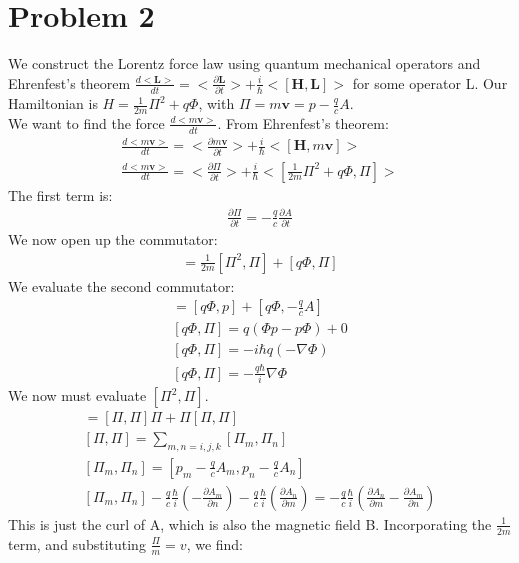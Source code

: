 \documentclass[a4paper,11pt]{article}
\numberwithin{equation}{section}
\newcommand{\bv}[1]{\mathbf{#1}}
\begin{document}
\section{Problem 2}
We construct the Lorentz force law using quantum mechanical operators and Ehrenfest's theorem 
$\frac{d<\bv{L}>}{dt}=<\frac{\partial \bv{L}}{\partial t} >+\frac{i}{\hbar}<[\bv{H}, \bv{L} ]>$ for some operator L.
Our Hamiltonian is $H=\frac{1}{2m}\Pi^2+q\Phi$, with $\Pi = m\bv{v}=p-\frac{q}{c}A$.
\\
We want to find the force $\frac{d<m\bv{v}>}{dt}$. From Ehrenfest's theorem:
\begin{gather}
 \frac{d<m\bv{v}>}{dt}=<\frac{\partial m\bv{v}}{\partial t} >+\frac{i}{\hbar}<[\bv{H}, m\bv{v} ]>\\
 \frac{d<m\bv{v}>}{dt}=<\frac{\partial \Pi}{\partial t} >+\frac{i}{\hbar}<[\frac{1}{2m}\Pi^2+q\Phi, \Pi ]>
\end{gather}
The first term is:
\begin{gather}
 \frac{\partial \Pi}{\partial t}=-\frac{q}{c}\frac{\partial A}{\partial t}
\end{gather}
We now open up the commutator:
\begin{gather}
 [\frac{1}{2m}\Pi^2+q\Phi, \Pi ]= \frac{1}{2m}[\Pi^2, \Pi] + [q\Phi, \Pi]
\end{gather}
We evaluate the second commutator:
\begin{gather}
 [q\Phi, \Pi]=[q\Phi,p]+[q\Phi,-\frac{q}{c}A]\\
 [q\Phi, \Pi]=q(\Phi p-p\Phi)+0\\
 [q\Phi, \Pi]=-i\hbar q(-\nabla \Phi)\\
 [q\Phi, \Pi]=-\frac{q \hbar}{i}\nabla\Phi
\end{gather}
We now must evaluate $[\Pi^2, \Pi]$.
\begin{gather}
 [\Pi^2,\Pi] = [\Pi, \Pi]\Pi+\Pi[\Pi, \Pi]\\
 [\Pi, \Pi] = \sum_{m,n = i,j,k} [\Pi_m, \Pi_n]\\
 [\Pi_m, \Pi_n] = [p_m-\frac{q}{c}A_m,p_n-\frac{q}{c}A_n]\\
 [\Pi_m, \Pi_n]-\frac{q}{c}\frac{\hbar}{i}(-\frac{\partial A_m}{\partial n})-\frac{q}{c}\frac{\hbar}{i}(\frac{\partial A_n}{\partial m})
      =-\frac{q}{c}\frac{\hbar}{i}(\frac{\partial A_n}{\partial m}-\frac{\partial A_m}{\partial n} )
\end{gather}
This is just the curl of A, which is also the magnetic field B. 
Incorporating the $\frac{1}{2m}$ term, and substituting $\frac{\Pi}{m}=v$, we find:
\end{document}
